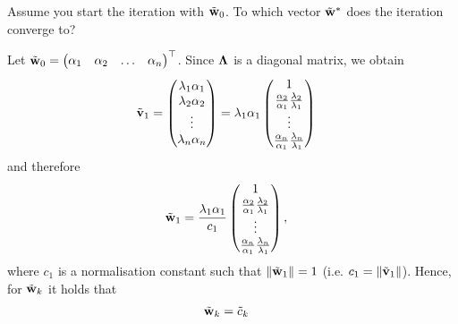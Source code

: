 \begin{exenumerate}
\begin{solution}
  \end{solution}
  
  
\item Assume you start the iteration with $\tilde{\mathbf{w}}_{0}$. To which vector $\tilde{\mathbf{w}}^{\ast}$ does the iteration converge to? 
  
  \begin{solution}
    Let $\tilde{\mathbf{w}}_0 = \begin{pmatrix} \alpha_1 & \alpha_2 & \ldots & \alpha_n \end{pmatrix}^\top$. Since $\mathbf{\Lambda}$ is a diagonal matrix, we obtain
    \begin{align}
      \tilde{\mathbf{v}}_1 &=  
                     \begin{pmatrix} 
                       \lambda_1\alpha_1 \\ 
                       \lambda_2\alpha_2 \\ 
                       \vdots \\ 
                       \lambda_n\alpha_n 
                     \end{pmatrix} 
                     = 
                     \lambda_1\alpha_1
                     \begin{pmatrix} 
                       1 \\ 
                       \frac{\alpha_2}{\alpha_1}\frac{\lambda_2}{\lambda_1} \\ 
                       \vdots \\ 
                       \frac{\alpha_n}{\alpha_1}\frac{\lambda_n}{\lambda_1}
                     \end{pmatrix}
    \end{align}
    and therefore 
    \begin{align}
      \tilde{\mathbf{w}}_1 &= \frac{\lambda_1\alpha_1}{c_1}
                     \begin{pmatrix} 1 \\
                       \frac{\alpha_2}{\alpha_1}\frac{\lambda_2}{\lambda_1} \\ 
                       \vdots \\ 
                       \frac{\alpha_n}{\alpha_1}\frac{\lambda_n}{\lambda_1}
                     \end{pmatrix},
    \end{align}
    where $c_1$ is a normalisation constant such that $\|\tilde{\mathbf{w}}_1\| = 1$ (i.e. $c_1 = \|\tilde{\mathbf{v}}_1\|$). Hence, for $\tilde{\mathbf{w}}_k$ it holds that
    \begin{align}
      \tilde{\w}_k &= \tilde{c}_k 

\end{align}
\end{solution}
\end{exenumerate}
